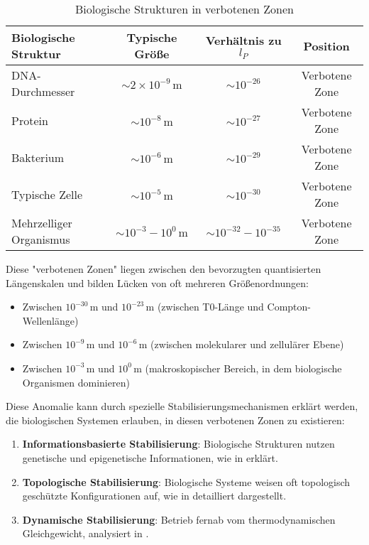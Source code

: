 \documentclass[12pt,a4paper]{article}
\begin{document}
\begin{table}[H]
	\centering
	\begin{tabular}{lccc}
		\toprule
		\textbf{Biologische Struktur} & \textbf{Typische Größe} & \textbf{Verhältnis zu \(l_P\)} & \textbf{Position} \\
		\midrule
		DNA-Durchmesser & \(\sim 2 \times 10^{-9} \, \text{m}\) & \(\sim 10^{-26}\) & Verbotene Zone \\
		Protein & \(\sim 10^{-8} \, \text{m}\) & \(\sim 10^{-27}\) & Verbotene Zone \\
		Bakterium & \(\sim 10^{-6} \, \text{m}\) & \(\sim 10^{-29}\) & Verbotene Zone \\
		Typische Zelle & \(\sim 10^{-5} \, \text{m}\) & \(\sim 10^{-30}\) & Verbotene Zone \\
		Mehrzelliger Organismus & \(\sim 10^{-3} - 10^{0} \, \text{m}\) & \(\sim 10^{-32} - 10^{-35}\) & Verbotene Zone \\
		\bottomrule
	\end{tabular}
	\caption{Biologische Strukturen in verbotenen Zonen}
	\label{tab:biological_anomalies}
\end{table}

Diese "verbotenen Zonen" liegen zwischen den bevorzugten quantisierten Längenskalen und bilden Lücken von oft mehreren Größenordnungen:
\begin{itemize}
	\item Zwischen \(10^{-30} \, \text{m}\) und \(10^{-23} \, \text{m}\) (zwischen T0-Länge und Compton-Wellenlänge)
	\item Zwischen \(10^{-9} \, \text{m}\) und \(10^{-6} \, \text{m}\) (zwischen molekularer und zellulärer Ebene)
	\item Zwischen \(10^{-3} \, \text{m}\) und \(10^{0} \, \text{m}\) (makroskopischer Bereich, in dem biologische Organismen dominieren)
\end{itemize}

Diese Anomalie kann durch spezielle Stabilisierungsmechanismen erklärt werden, die biologischen Systemen erlauben, in diesen verbotenen Zonen zu existieren:

\begin{enumerate}
	\item \textbf{Informationsbasierte Stabilisierung}: Biologische Strukturen nutzen genetische und epigenetische Informationen, wie in \cite{pascher_bio_2025} erklärt.
	\item \textbf{Topologische Stabilisierung}: Biologische Systeme weisen oft topologisch geschützte Konfigurationen auf, wie in \cite{pascher_quantum_2025} detailliert dargestellt.
	\item \textbf{Dynamische Stabilisierung}: Betrieb fernab vom thermodynamischen Gleichgewicht, analysiert in \cite{pascher_galaxies_2025}.
\end{enumerate}
\end{document}

